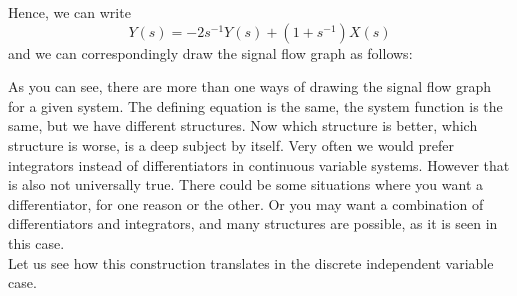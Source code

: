 Hence, we can write
\[
Y(s) = -2s^{-1}Y(s) + (1+s^{-1})X(s)
\]
and we can correspondingly draw the signal flow graph as follows:
\begin{center}
\end{center}
As you can see, there are more than one ways of drawing the signal flow graph for a given system. The defining equation is the same, the system function is the same, but we have different structures. Now which structure is better, which structure is worse, is a deep subject by itself. Very often we would prefer integrators instead of differentiators in continuous variable systems. However that is also not universally true. There could be some situations where you want a differentiator, for one reason or the other. Or you may want a combination of differentiators and integrators, and many structures are possible, as it is seen in this case.\\
Let us see how this construction translates in the discrete independent variable case.

